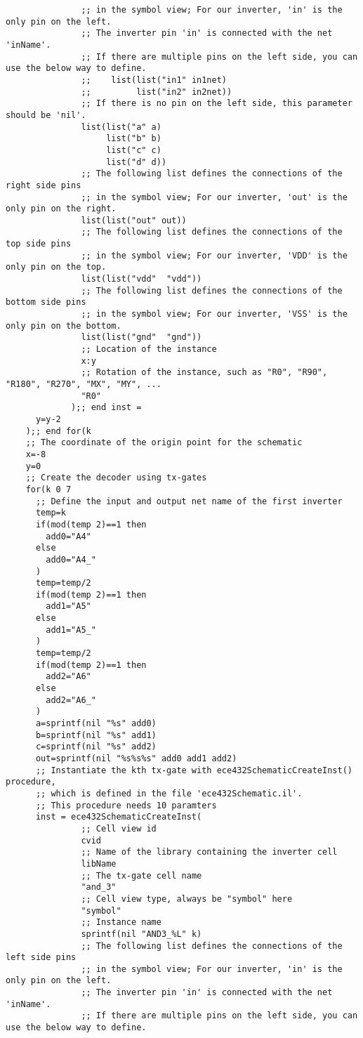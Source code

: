 \begin{lstlisting}
			   ;; in the symbol view; For our inverter, 'in' is the only pin on the left.
			   ;; The inverter pin 'in' is connected with the net 'inName'.
			   ;; If there are multiple pins on the left side, you can use the below way to define.
			   ;;    list(list("in1" in1net)
			   ;;         list("in2" in2net))
			   ;; If there is no pin on the left side, this parameter should be 'nil'.
	  		   list(list("a" a) 
			   		list("b" b)
			   		list("c" c)
			   		list("d" d))		   
			   ;; The following list defines the connections of the right side pins 
			   ;; in the symbol view; For our inverter, 'out' is the only pin on the right.
	  		   list(list("out" out)) 
			   ;; The following list defines the connections of the top side pins 
			   ;; in the symbol view; For our inverter, 'VDD' is the only pin on the top.
	  		   list(list("vdd"  "vdd")) 
			   ;; The following list defines the connections of the bottom side pins 
			   ;; in the symbol view; For our inverter, 'VSS' is the only pin on the bottom.
		       list(list("gnd"  "gnd"))		   
			   ;; Location of the instance
	           x:y 		   
			   ;; Rotation of the instance, such as "R0", "R90", "R180", "R270", "MX", "MY", ...
			   "R0"
			 );; end inst =	       
	  y=y-2  
	);; end for(k
	;; The coordinate of the origin point for the schematic
    x=-8
    y=0	
	;; Create the decoder using tx-gates
	for(k 0 7
	  ;; Define the input and output net name of the first inverter
	  temp=k
	  if(mod(temp 2)==1 then
		add0="A4"
	  else
		add0="A4_"
      )
      temp=temp/2
	  if(mod(temp 2)==1 then
		add1="A5"
	  else
		add1="A5_"
      )
      temp=temp/2
	  if(mod(temp 2)==1 then
		add2="A6"
	  else
		add2="A6_"
      )
	  a=sprintf(nil "%s" add0)
	  b=sprintf(nil "%s" add1)
	  c=sprintf(nil "%s" add2)
	  out=sprintf(nil "%s%s%s" add0 add1 add2)
	  ;; Instantiate the kth tx-gate with ece432SchematicCreateInst() procedure, 
	  ;; which is defined in the file 'ece432Schematic.il'. 
	  ;; This procedure needs 10 paramters
	  inst = ece432SchematicCreateInst(
		       ;; Cell view id
			   cvid 		   
			   ;; Name of the library containing the inverter cell
			   libName		   
		       ;; The tx-gate cell name  
	           "and_3"  	   
			   ;; Cell view type, always be "symbol" here
			   "symbol" 	   
			   ;; Instance name
		       sprintf(nil "AND3_%L" k) 	   
			   ;; The following list defines the connections of the left side pins 
			   ;; in the symbol view; For our inverter, 'in' is the only pin on the left.
			   ;; The inverter pin 'in' is connected with the net 'inName'.
			   ;; If there are multiple pins on the left side, you can use the below way to define.

\end{lstlisting}
